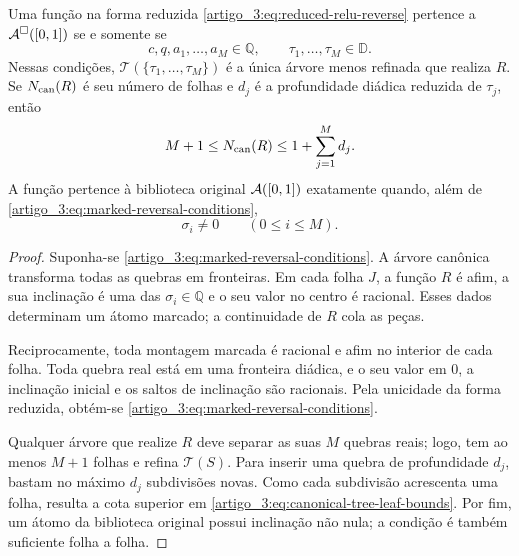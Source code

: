 \begin{theorem}\label{map:artigo_3:5.2}
\label{artigo_3:thm:exact-marked-reversal}
Uma função na forma reduzida \eqref{artigo_3:eq:reduced-relu-reverse} pertence a
$\mathcal{A}^\square([0,1])$ se e somente se
\begin{equation}
 c,q,a_1,\ldots,a_M\in\mathbb Q,
 \qquad
 \tau_1,\ldots,\tau_M\in\mathbb D.
 \label{artigo_3:eq:marked-reversal-conditions}
\end{equation}
Nessas condições, $\mathcal T(\{\tau_1,\ldots,\tau_M\})$ é a única árvore
menos refinada que realiza $R$. Se $N_{\rm can}(R)$ é seu número de folhas e
$d_j$ é a profundidade diádica reduzida de $\tau_j$, então
\begin{equation}
 M+1\le N_{\rm can}(R)
 \le 1+\sum_{j=1}^{M}d_j.
 \label{artigo_3:eq:canonical-tree-leaf-bounds}
\end{equation}
A função pertence à biblioteca original $\mathcal{A}([0,1])$ exatamente quando,
além de \eqref{artigo_3:eq:marked-reversal-conditions},
\begin{equation}
 \sigma_i\ne0\qquad(0\le i\le M).
 \label{artigo_3:eq:original-nonflat-condition}
\end{equation}
\end{theorem}

\begin{proof}
Suponha-se \eqref{artigo_3:eq:marked-reversal-conditions}. A árvore canônica transforma
todas as quebras em fronteiras. Em cada folha $J$, a função $R$ é afim, a sua
inclinação é uma das $\sigma_i\in\mathbb Q$ e o seu valor no centro é racional.
Esses dados determinam um átomo marcado; a continuidade de $R$ cola as peças.

Reciprocamente, toda montagem marcada é racional e afim no interior de cada
folha. Toda quebra real está em uma fronteira diádica, e o seu valor em $0$, a
inclinação inicial e os saltos de inclinação são racionais. Pela unicidade da
forma reduzida, obtém-se \eqref{artigo_3:eq:marked-reversal-conditions}.

Qualquer árvore que realize $R$ deve separar as suas $M$ quebras reais; logo, tem
ao menos $M+1$ folhas e refina $\mathcal T(S)$. Para inserir uma quebra de
profundidade $d_j$, bastam no máximo $d_j$ subdivisões novas. Como cada
subdivisão acrescenta uma folha, resulta a cota superior em
\eqref{artigo_3:eq:canonical-tree-leaf-bounds}. Por fim, um átomo da biblioteca
original possui inclinação não nula; a condição é também suficiente folha a
folha.
\end{proof}

